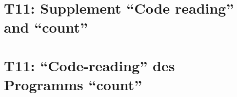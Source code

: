 
\thispagestyle{empty}
\ifenglish
\section*{T11: Supplement ``Code reading'' and ``count''}

\fi
\ifgerman
\section*{T11: "`Code-reading"' des Programms "`count"'}

\fi

